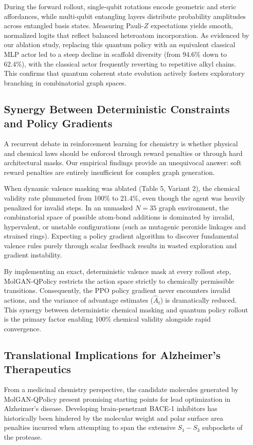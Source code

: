 \documentclass[10pt,a4paper]{article}
\begin{document}
During the forward rollout, single-qubit rotations encode geometric and steric affordances, while multi-qubit entangling layers distribute probability amplitudes across entangled basis states. Measuring Pauli-$Z$ expectations yields smooth, normalized logits that reflect balanced heteroatom incorporation. As evidenced by our ablation study, replacing this quantum policy with an equivalent classical MLP actor led to a steep decline in scaffold diversity (from 94.6\% down to 62.4\%), with the classical actor frequently reverting to repetitive alkyl chains. This confirms that quantum coherent state evolution actively fosters exploratory branching in combinatorial graph spaces.

\subsection{Synergy Between Deterministic Constraints and Policy Gradients}
A recurrent debate in reinforcement learning for chemistry is whether physical and chemical laws should be enforced through reward penalties or through hard architectural masks. Our empirical findings provide an unequivocal answer: soft reward penalties are entirely insufficient for complex graph generation.

When dynamic valence masking was ablated (Table 5, Variant 2), the chemical validity rate plummeted from 100\% to 21.4\%, even though the agent was heavily penalized for invalid steps. In an unmasked $N=35$ graph environment, the combinatorial space of possible atom-bond additions is dominated by invalid, hypervalent, or unstable configurations (such as mutagenic peroxide linkages and strained rings). Expecting a policy gradient algorithm to discover fundamental valence rules purely through scalar feedback results in wasted exploration and gradient instability. 

By implementing an exact, deterministic valence mask at every rollout step, MolGAN-QPolicy restricts the action space strictly to chemically permissible transitions. Consequently, the PPO policy gradient never encounters invalid actions, and the variance of advantage estimates ($\hat{A}_t$) is dramatically reduced. This synergy between deterministic chemical masking and quantum policy rollout is the primary factor enabling 100\% chemical validity alongside rapid convergence.

\subsection{Translational Implications for Alzheimer's Therapeutics}
From a medicinal chemistry perspective, the candidate molecules generated by MolGAN-QPolicy present promising starting points for lead optimization in Alzheimer's disease. Developing brain-penetrant BACE-1 inhibitors has historically been hindered by the molecular weight and polar surface area penalties incurred when attempting to span the extensive $S_1-S_3$ subpockets of the protease.
\end{document}
